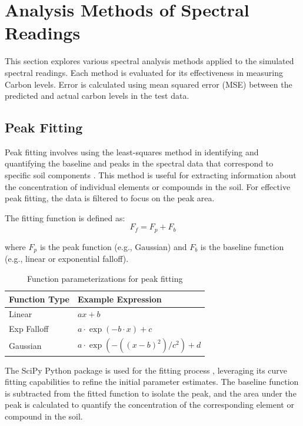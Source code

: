\documentclass[review]{elsarticle}
\begin{document}
\section{Analysis Methods of Spectral Readings}

This section explores various spectral analysis methods applied to the simulated spectral readings. Each method is evaluated for its effectiveness in measuring Carbon levels. Error is calculated using mean squared error (MSE) between the predicted and actual carbon levels in the test data.

\subsection{Peak Fitting}

Peak fitting involves using the least-squares method in identifying and quantifying the baseline and peaks in the spectral data that correspond to specific soil components \cite{gardner_use_2011}. This method is useful for extracting information about the concentration of individual elements or compounds in the soil. For effective peak fitting, the data is filtered to focus on the peak area.

The fitting function is defined as:
\begin{equation}
F_f = F_p + F_b
\end{equation}

where $F_p$ is the peak function (e.g., Gaussian) and $F_b$ is the baseline function (e.g., linear or exponential falloff).

\begin{table}[H]
\centering
\caption{Function parameterizations for peak fitting}
\label{tab:functions}
\begin{tabular}{ll}
\toprule
Function Type & Example Expression \\
\midrule
Linear & $ax + b$ \\
Exp Falloff & $a \cdot \exp(-b \cdot x) + c$ \\
Gaussian & $a \cdot \exp(-((x - b)^2)/c^2) + d$ \\
\bottomrule
\end{tabular}
\end{table}

The SciPy Python package is used for the fitting process \cite{virtanen_scipy_2020}, leveraging its curve fitting capabilities to refine the initial parameter estimates. The baseline function is subtracted from the fitted function to isolate the peak, and the area under the peak is calculated to quantify the concentration of the corresponding element or compound in the soil.
\end{document}
